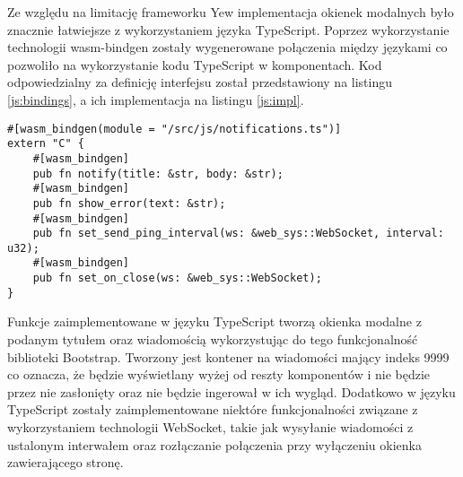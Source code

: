 Ze względu na limitację frameworku Yew implementacja okienek modalnych było 
znacznie łatwiejsze z wykorzystaniem języka TypeScript. Poprzez wykorzystanie
technologii wasm-bindgen zostały wygenerowane połączenia między językami co pozwoliło
na wykorzystanie kodu TypeScript w komponentach. Kod odpowiedzialny za
definicję interfejsu został przedstawiony na listingu \ref{js:bindings}, a
ich implementacja na listingu \ref{js:impl}.
\begin{lstlisting}[caption={Interfejs dla funkcjonalnosci notyfikacji oraz WebSocket},label={js:bindings},captionpos=b]
#[wasm_bindgen(module = "/src/js/notifications.ts")]
extern "C" {
    #[wasm_bindgen]
    pub fn notify(title: &str, body: &str);
    #[wasm_bindgen]
    pub fn show_error(text: &str);
    #[wasm_bindgen]
    pub fn set_send_ping_interval(ws: &web_sys::WebSocket, interval: u32);
    #[wasm_bindgen]
    pub fn set_on_close(ws: &web_sys::WebSocket);
}
\end{lstlisting}
Funkcje zaimplementowane w języku TypeScript tworzą okienka modalne z podanym tytułem oraz
wiadomością wykorzystując do tego funkcjonalność biblioteki Bootstrap. Tworzony jest
kontener na wiadomości mający indeks 9999 co oznacza, że będzie wyświetlany wyżej
od reszty komponentów i nie będzie przez nie zasłonięty oraz nie będzie ingerował w ich
wygląd. Dodatkowo w języku TypeScript zostały zaimplementowane niektóre funkcjonalności
związane z wykorzystaniem technologii WebSocket, takie jak wysyłanie wiadomości z ustalonym
interwałem oraz rozłączanie połączenia przy wyłączeniu okienka zawierającego stronę.

